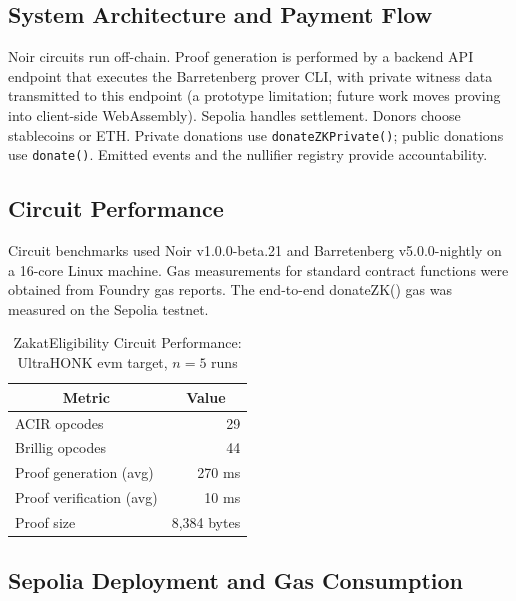 \documentclass[conference]{IEEEtran}
\begin{document}
\subsection{System Architecture and Payment Flow}

Noir circuits run off-chain\cite{b_noir}\cite{b_aztec}. Proof generation is performed by a backend API endpoint that executes the Barretenberg prover CLI\cite{b_aztec}, with private witness data transmitted to this endpoint (a prototype limitation; future work moves proving into client-side WebAssembly\cite{b_pwa_survey}). Sepolia handles settlement\cite{b_ziswaf_blockchain}. Donors choose stablecoins or ETH\cite{b_halal_crypto}\cite{b_fatwa_crypto}. Private donations use \texttt{donateZKPrivate()}; public donations use \texttt{donate()}\cite{b_zkfi}. Emitted events and the nullifier registry provide accountability\cite{b_maqasid_data}\cite{b_maqasid_privacy}.

\subsection{Circuit Performance}

Circuit benchmarks used Noir v1.0.0-beta.21 and Barretenberg v5.0.0-nightly on a 16-core Linux machine\cite{b_aztec}\cite{b_noir}. Gas measurements for standard contract functions were obtained from Foundry gas reports. The end-to-end donateZK() gas was measured on the Sepolia testnet\cite{b_zkp_financial}.

\begin{table}[htbp]
\caption{ZakatEligibility Circuit Performance: UltraHONK evm target, $n=5$ runs}
\label{tab:proof_perf}
\begin{center}
\begin{tabular}{|l|r|}
\hline
\multicolumn{1}{|c|}{\textbf{Metric}} & \multicolumn{1}{c|}{\textbf{Value}} \\
\hline
ACIR opcodes               & 29 \\
Brillig opcodes            & 44 \\
Proof generation (avg)     & 270 ms \\
Proof verification (avg)    & 10 ms \\
Proof size                  & 8,384 bytes \\
\hline
\end{tabular}
\end{center}
\end{table}

\subsection{Sepolia Deployment and Gas Consumption}
\end{document}
